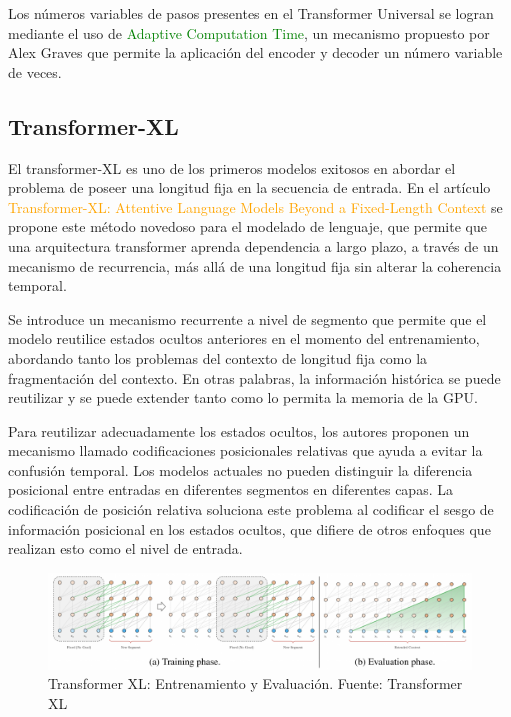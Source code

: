 \documentclass[conference]{IEEEtran}
\begin{document}
\vspace{0.2cm}

Los n\'umeros variables de pasos presentes en el Transformer Universal se logran mediante el uso de \textcolor{green}{Adaptive Computation Time}, un mecanismo propuesto por Alex Graves \cite{b6} que permite la aplicaci\'on del encoder y decoder un n\'umero variable de veces.
	
\vspace{0.2cm}

\subsection{Transformer-XL}

El transformer-XL es uno de los primeros modelos exitosos en abordar el problema de poseer una longitud fija en la secuencia de entrada. En el art\'iculo \textcolor{orange}{Transformer-XL: Attentive Language Models Beyond a Fixed-Length Context} \cite{b7} se propone este m\'etodo novedoso para el modelado de lenguaje, que permite que una arquitectura transformer aprenda dependencia a largo plazo, a trav\'es de un mecanismo de recurrencia, m\'as all\'a de una longitud fija sin alterar la coherencia temporal.

\vspace{0.2cm}

Se introduce un mecanismo recurrente a nivel de segmento que permite que el modelo reutilice estados ocultos anteriores en el momento del entrenamiento, abordando tanto los problemas del contexto de longitud fija como la fragmentaci\'on del contexto. En otras palabras, la informaci\'on hist\'orica se puede reutilizar y se puede extender tanto como lo permita la memoria de la GPU.
	
\vspace{0.2cm}

Para reutilizar adecuadamente los estados ocultos, los autores proponen un mecanismo llamado codificaciones posicionales relativas  que ayuda a evitar la confusi\'on temporal. Los modelos actuales no pueden distinguir la diferencia posicional entre entradas en diferentes segmentos en diferentes capas. La codificaci\'on de posici\'on relativa soluciona este problema al codificar el sesgo de informaci\'on posicional en los estados ocultos, que difiere de otros enfoques que realizan esto como el nivel de entrada.

\begin{figure}[h]
\includegraphics[scale=0.25]{imagenes/TransformerXL1.png} 
\caption{Transformer XL: Entrenamiento y Evaluación. Fuente: Transformer XL \cite{b7}}
\end{figure}
\end{document}
